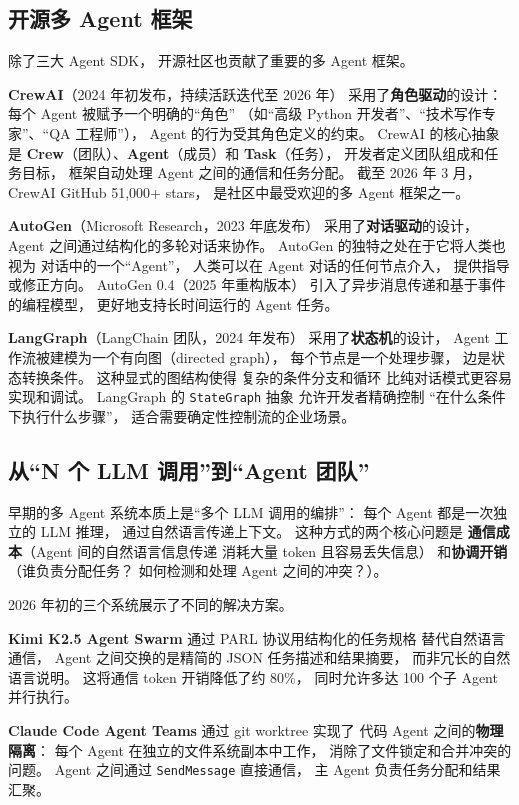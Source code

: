\subsection{开源多 Agent 框架}

除了三大 Agent SDK，
开源社区也贡献了重要的多 Agent 框架。

\textbf{CrewAI}（2024 年初发布，持续活跃迭代至 2026 年）
采用了\textbf{角色驱动}的设计：
每个 Agent 被赋予一个明确的“角色”
（如“高级 Python 开发者”、“技术写作专家”、“QA 工程师”），
Agent 的行为受其角色定义的约束。
CrewAI 的核心抽象是
\textbf{Crew}（团队）、\textbf{Agent}（成员）和 \textbf{Task}（任务），
开发者定义团队组成和任务目标，
框架自动处理 Agent 之间的通信和任务分配。
截至 2026 年 3 月，
CrewAI GitHub 51,000+ stars，
是社区中最受欢迎的多 Agent 框架之一。

\textbf{AutoGen}（Microsoft Research，2023 年底发布）
采用了\textbf{对话驱动}的设计，
Agent 之间通过结构化的多轮对话来协作。
AutoGen 的独特之处在于它将人类也视为
对话中的一个“Agent”，
人类可以在 Agent 对话的任何节点介入，
提供指导或修正方向。
AutoGen 0.4（2025 年重构版本）
引入了异步消息传递和基于事件的编程模型，
更好地支持长时间运行的 Agent 任务。

\textbf{LangGraph}（LangChain 团队，2024 年发布）
采用了\textbf{状态机}的设计，
Agent 工作流被建模为一个有向图（directed graph），
每个节点是一个处理步骤，
边是状态转换条件。
这种显式的图结构使得
复杂的条件分支和循环
比纯对话模式更容易实现和调试。
LangGraph 的 \texttt{StateGraph} 抽象
允许开发者精确控制
“在什么条件下执行什么步骤”，
适合需要确定性控制流的企业场景。

\subsection{从“N 个 LLM 调用”到“Agent 团队”}

早期的多 Agent 系统本质上是“多个 LLM 调用的编排”：
每个 Agent 都是一次独立的 LLM 推理，
通过自然语言传递上下文。
这种方式的两个核心问题是
\textbf{通信成本}（Agent 间的自然语言信息传递
消耗大量 token 且容易丢失信息）
和\textbf{协调开销}（谁负责分配任务？
如何检测和处理 Agent 之间的冲突？）。

2026 年初的三个系统展示了不同的解决方案。

\textbf{Kimi K2.5 Agent Swarm}
通过 PARL 协议用结构化的任务规格
替代自然语言通信，
Agent 之间交换的是精简的 JSON 任务描述和结果摘要，
而非冗长的自然语言说明。
这将通信 token 开销降低了约 80\%，
同时允许多达 100 个子 Agent 并行执行。

\textbf{Claude Code Agent Teams}
通过 git worktree 实现了
代码 Agent 之间的\textbf{物理隔离}：
每个 Agent 在独立的文件系统副本中工作，
消除了文件锁定和合并冲突的问题。
Agent 之间通过 \texttt{SendMessage} 直接通信，
主 Agent 负责任务分配和结果汇聚。

